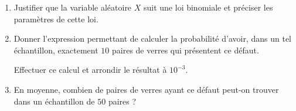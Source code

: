 \medskip

\begin{enumerate}
\item Justifier que la variable aléatoire $X$ suit une loi binomiale et préciser les paramètres de cette loi.
\item Donner l'expression permettant de calculer la probabilité d'avoir, dans un tel échantillon, exactement $10$ paires de verres qui présentent ce défaut.

Effectuer ce calcul et arrondir le résultat à $10^{-3}$.
\item En moyenne, combien de paires de verres ayant ce défaut peut-on trouver dans un échantillon de $50$ paires ?
\end{enumerate}
